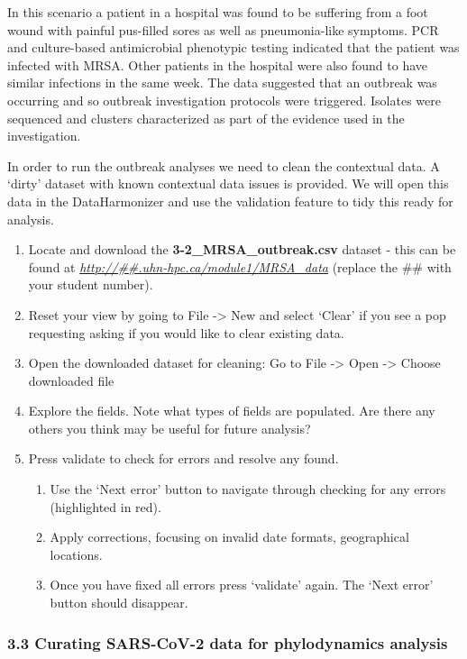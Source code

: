 \documentclass[
]{book}
\providecommand{\tightlist}{%
  \setlength{\itemsep}{0pt}\setlength{\parskip}{0pt}}
\begin{document}
In this scenario a patient in a hospital was found to be suffering from a foot wound with painful pus-filled sores as well as pneumonia-like symptoms. PCR and culture-based antimicrobial phenotypic testing indicated that the patient was infected with MRSA. Other patients in the hospital were also found to have similar infections in the same week. The data suggested that an outbreak was occurring and so outbreak investigation protocols were triggered. Isolates were sequenced and clusters characterized as part of the evidence used in the investigation.

In order to run the outbreak analyses we need to clean the contextual data. A `dirty' dataset with known contextual data issues is provided. We will open this data in the DataHarmonizer and use the validation feature to tidy this ready for analysis.

\begin{enumerate}
\def\labelenumi{\arabic{enumi}.}
\tightlist
\item
  Locate and download the \textbf{3-2\_MRSA\_outbreak.csv} dataset - this can be found at \emph{\url{http://\#\#.uhn-hpc.ca/module1/MRSA_data}} (replace the \#\# with your student number).
\item
  Reset your view by going to File -\textgreater{} New and select `Clear' if you see a pop requesting asking if you would like to clear existing data.
\item
  Open the downloaded dataset for cleaning: Go to File -\textgreater{} Open -\textgreater{} Choose downloaded file
\item
  Explore the fields. Note what types of fields are populated. Are there any others you think may be useful for future analysis?
\item
  Press validate to check for errors and resolve any found.

  \begin{enumerate}
  \def\labelenumii{\roman{enumii}.}
  \tightlist
  \item
    Use the `Next error' button to navigate through checking for any errors (highlighted in red).
  \item
    Apply corrections, focusing on invalid date formats, geographical locations.
  \item
    Once you have fixed all errors press `validate' again. The `Next error' button should disappear.
  \end{enumerate}
\end{enumerate}

\subsubsection{3.3 Curating SARS-CoV-2 data for phylodynamics analysis}\label{curating-sars-cov-2-data-for-phylodynamics-analysis}
\end{document}
